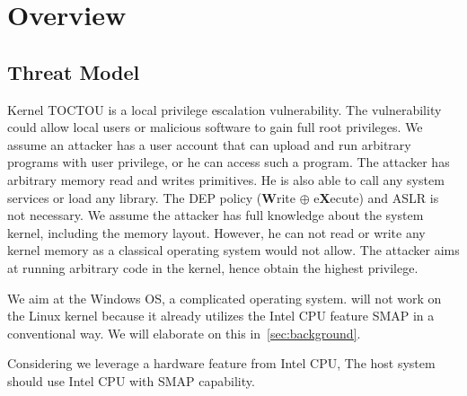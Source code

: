 \section{Overview}
\label{sec:overview}

\subsection{Threat Model}
\label{sec:threatmodel}

Kernel TOCTOU is a local privilege escalation vulnerability. The vulnerability could allow local users or malicious software to gain full root privileges. We assume an attacker has a user account that can upload and run arbitrary programs with user privilege, or he can access such a program. The attacker has arbitrary memory read and writes primitives. He is also able to call any system services or load any library. The DEP policy (\textbf{W}rite $\oplus$ e\textbf{X}ecute) and ASLR is not necessary. We assume the attacker has full knowledge about the system kernel, including the memory layout. However, he can not read or write any kernel memory as a classical operating system would not allow. The attacker aims at running arbitrary code in the kernel, hence obtain the highest privilege. 

We aim at the Windows OS, a complicated operating system. \name will not work on the Linux kernel because it already utilizes the Intel CPU feature SMAP in a conventional way. We will elaborate on this in~\autoref{sec:background}.


Considering we leverage a hardware feature from Intel CPU, The host system should use Intel CPU with SMAP capability.
